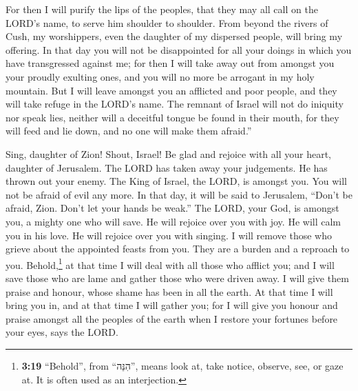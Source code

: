 For then I will purify the lips of the peoples, that they
may all call on the LORD's name, to serve him shoulder to shoulder.
 From beyond the rivers of Cush, my worshippers, even the
daughter of my dispersed people, will bring my offering. 
In that day you will not be disappointed for all your doings in which
you have transgressed against me; for then I will take away out from
amongst you your proudly exulting ones, and you will no more be arrogant
in my holy mountain.  But I will leave amongst you an
afflicted and poor people, and they will take refuge in the LORD's name.
 The remnant of Israel will not do iniquity nor speak
lies, neither will a deceitful tongue be found in their mouth, for they
will feed and lie down, and no one will make them afraid.''

 Sing, daughter of Zion! Shout, Israel! Be glad and
rejoice with all your heart, daughter of Jerusalem.  The
LORD has taken away your judgements. He has thrown out your enemy. The
King of Israel, the LORD, is amongst you. You will not be afraid of evil
any more.  In that day, it will be said to Jerusalem,
``Don't be afraid, Zion. Don't let your hands be weak.'' 
The LORD, your God, is amongst you, a mighty one who will save. He will
rejoice over you with joy. He will calm you in his love. He will rejoice
over you with singing.  I will remove those who grieve
about the appointed feasts from you. They are a burden and a reproach to
you.  Behold,\footnote{\textbf{3:19} ``Behold'', from
  ``הִנֵּה'', means look at, take notice, observe, see, or gaze at. It
  is often used as an interjection.} at that time I will deal with all
those who afflict you; and I will save those who are lame and gather
those who were driven away. I will give them praise and honour, whose
shame has been in all the earth.  At that time I will
bring you in, and at that time I will gather you; for I will give you
honour and praise amongst all the peoples of the earth when I restore
your fortunes before your eyes, says the LORD.
